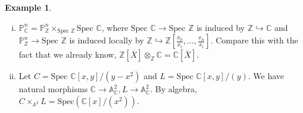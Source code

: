 \documentclass{article}
\theoremstyle{definition}
\newtheorem{example}{Example}[section]
\begin{document}
\begin{example}
    \begin{enumerate}[(i)]
        \item $\mathbb{P}_{\mathbb{C}}^n = \mathbb{P}_{\mathbb{Z}}^n \times_{\text{Spec }\mathbb{Z}} \text{Spec }\mathbb{C}$, where $\text{Spec }\mathbb{C} \to \text{Spec }\mathbb{Z}$ is induced by $\mathbb{Z} \hookrightarrow \mathbb{C}$ and $\mathbb{P}_{\mathbb{Z}}^n \to \text{Spec }\mathbb{Z}$ is induced locally by $\mathbb{Z} \hookrightarrow \mathbb{Z}\left[\frac{x_0}{x_i},\ldots,\frac{x_n}{x_i}\right]$. Compare this with the fact that we already know, $\mathbb{Z}[\overline{X}] \otimes_{\mathbb{Z}} \mathbb{C} = \mathbb{C}[\overline{X}]$.
        \item Let $C = \text{Spec }\mathbb{C}[x,y]/(y-x^2)$ and $L = \text{Spec }\mathbb{C}[x,y]/(y)$. We have natural morphisms $\mathbb{C} \to \mathbb{A}_{\mathbb{C}}^2, L \to \mathbb{A}_{\mathbb{C}}^2$. By algebra, $C \times_{\mathbb{A}^2} L = \text{Spec}(\mathbb{C}[x]/(x^2))$.
    \end{enumerate}
\end{example}
\end{document}
